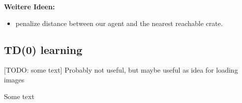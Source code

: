 \documentclass[a4paper]{article}
\begin{document}
\noindent \Large \textbf{Weitere Ideen:}  \normalsize 
\begin{itemize}
      \item  penalize distance between our agent and the nearest  reachable crate.
\end{itemize}


\newpage
\subsection*{TD(0) learning}
[TODO: some text]
Probably not useful, but maybe useful as idea for loading images

\begin{minipage}{\columnwidth}
\makeatletter
\newcommand{\@captype}{figure}
\makeatother
\centering
\captionsetup[subfigure]{labelformat=empty}
 \qquad \qquad%
\caption{Some text}
\label{fig-data-prep}
\end{minipage}
\end{document}
